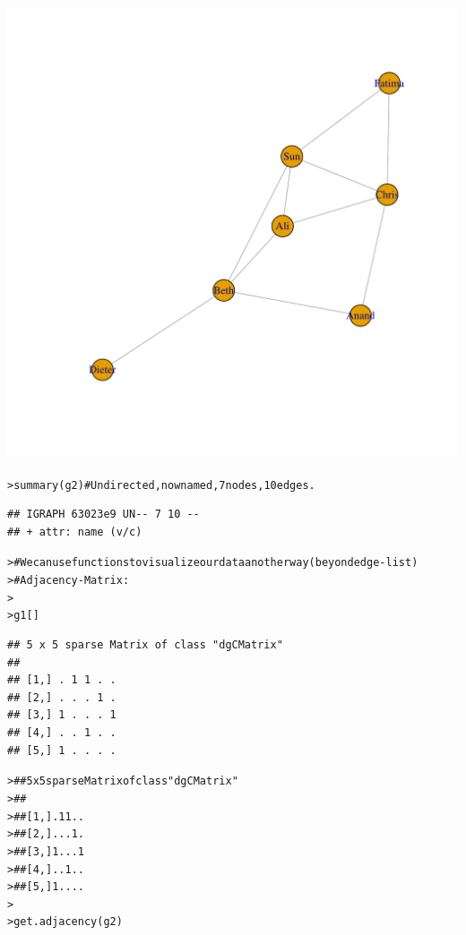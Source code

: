 \documentclass[12pt]{article}\usepackage[]{graphicx}\usepackage[]{color}
\makeatletter
\newcommand{\hlcom}[1]{\textcolor[rgb]{0.404,0.408,0.42}{#1}}%
\newcommand{\hlstd}[1]{\textcolor[rgb]{0.882,0.878,0.898}{#1}}%
\newcommand{\hlkwd}[1]{\textcolor[rgb]{0.733,0.388,0.812}{#1}}%
\newenvironment{kframe}{%
 \def\at@end@of@kframe{}%
 \ifinner\ifhmode%
  \def\at@end@of@kframe{\end{minipage}}%
  \begin{minipage}{\columnwidth}%
 \fi\fi%
 \def\FrameCommand##1{\hskip\@totalleftmargin \hskip-\fboxsep
 \colorbox{shadecolor}{##1}\hskip-\fboxsep
     \hskip-\linewidth \hskip-\@totalleftmargin \hskip\columnwidth}%
 \MakeFramed {\advance\hsize-\width
   \@totalleftmargin\z@ \linewidth\hsize
   \@setminipage}}%
 {\par\unskip\endMakeFramed%
 \at@end@of@kframe}
\newenvironment{knitrout}{}{} %
\makeatother
\begin{document}
\begin{flushleft}
\begin{center}
\begin{knitrout}
\includegraphics[width=6in]{figure/Network_Basics-2} 
\begin{kframe}\begin{alltt}
\hlstd{> }\hlkwd{summary}\hlstd{(g2)} \hlcom{# Undirected, now named, 7 nodes, 10 edges.}
\end{alltt}
\begin{verbatim}
## IGRAPH 63023e9 UN-- 7 10 -- 
## + attr: name (v/c)
\end{verbatim}
\begin{alltt}
\hlstd{> }\hlcom{# We can use functions to visualize our data another way (beyond edge-list)}
\hlstd{> }\hlcom{# Adjacency-Matrix:}
\hlstd{> }
\hlstd{> }\hlstd{g1[]}
\end{alltt}
\begin{verbatim}
## 5 x 5 sparse Matrix of class "dgCMatrix"
##               
## [1,] . 1 1 . .
## [2,] . . . 1 .
## [3,] 1 . . . 1
## [4,] . . 1 . .
## [5,] 1 . . . .
\end{verbatim}
\begin{alltt}
\hlstd{> }\hlcom{## 5 x 5 sparse Matrix of class "dgCMatrix"}
\hlstd{> }\hlcom{##}
\hlstd{> }\hlcom{## [1,] . 1 1 . .}
\hlstd{> }\hlcom{## [2,] . . . 1 .}
\hlstd{> }\hlcom{## [3,] 1 . . . 1}
\hlstd{> }\hlcom{## [4,] . . 1 . .}
\hlstd{> }\hlcom{## [5,] 1 . . . .}
\hlstd{> }
\hlstd{> }\hlkwd{get.adjacency}\hlstd{(g2)}
\end{alltt}

\end{kframe}
\end{knitrout}
\end{center}
\end{flushleft}
\end{document}
